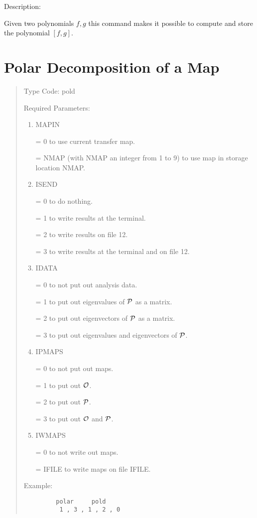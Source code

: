 \vspace{5mm}
     Description:
\vspace{2mm}

Given two polynomials $f,g$ this command makes it possible to compute and store the polynomial $[f,g]$.

\newpage
\section{Polar Decomposition of a Map}
\begin{quotation}
\noindent     Type Code:  pold
\vspace{5mm}

\noindent Required Parameters:
\begin{enumerate}
      \item  MAPIN

             = 0 to use current transfer map.

             = NMAP (with NMAP an integer from 1 to 9) to use map in
               storage location \hspace*{1em}NMAP.

      \item  ISEND

             = 0 to do nothing.

             = 1 to write results at the terminal.

             = 2 to write results on file 12.

             = 3 to write results at the terminal and on file 12.

      \item  IDATA

             = 0 to not put out analysis data.

             = 1 to put out eigenvalues of ${\cal P}$ as a matrix.

             = 2 to put out eigenvectors of ${\cal P}$ as a matrix.

             = 3 to put out eigenvalues and eigenvectors of ${\cal P}$.

      \item  IPMAPS

             = 0 to not put out maps.

             = 1 to put out ${\cal O}$.

             = 2 to put out ${\cal P}$.

             = 3 to put out ${\cal O}$ and ${\cal P}$.

      \item  IWMAPS

             = 0 to not write out maps.

             = IFILE to write maps on file IFILE.
\end{enumerate}

\vspace{5mm}
\noindent Example:
\begin{verbatim}
         polar     pold
          1 , 3 , 1 , 2 , 0
\end{verbatim}
\end{quotation}
